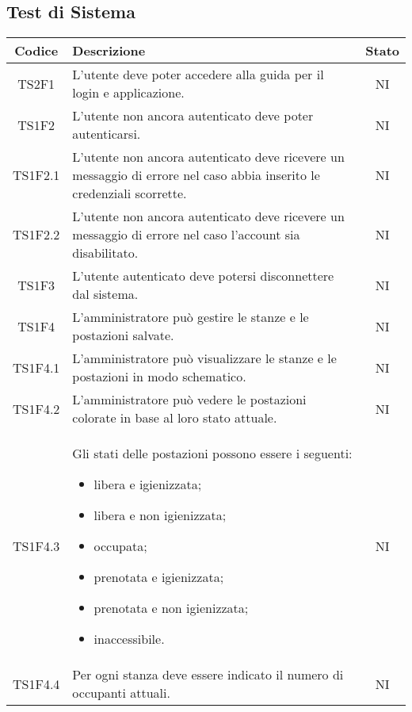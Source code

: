 	\subsection{Test di Sistema}
	\begin{center}
		\begin{longtable}{|c|p{10cm}|c|}
			\hline
			\rowcolor{lighter-grayer}
			\textbf{Codice} & \textbf{Descrizione} & \textbf{Stato}  \\ 
						
			\hline
			\endhead
			
			\hline
			TS2F1 & L'utente deve poter accedere alla guida per il login e applicazione. & NI \\
			\hline
			TS1F2 & L'utente non ancora autenticato deve poter autenticarsi. & NI \\			
			\hline
			TS1F2.1 & L'utente non ancora autenticato deve ricevere un messaggio di errore nel caso abbia inserito le credenziali scorrette. & NI \\			
			\hline
			TS1F2.2 & L'utente non ancora autenticato deve ricevere un messaggio di errore nel caso l'account sia disabilitato. & NI \\			
			\hline
			TS1F3 & L'utente autenticato deve potersi disconnettere dal sistema. & NI \\			
			\hline
			TS1F4 & L'amministratore può gestire le stanze e le postazioni salvate. & NI \\			
			\hline
			TS1F4.1 & L'amministratore può visualizzare le stanze e le postazioni in modo schematico. & NI \\			
			\hline
			TS1F4.2 & L'amministratore può vedere le postazioni colorate in base al loro stato attuale. & NI \\			
			\hline
			TS1F4.3 & Gli stati delle postazioni possono essere i seguenti:
			 \begin{itemize}
			 	\item libera e igienizzata;
			 	\item libera e non igienizzata;
			 	\item occupata;
			 	\item prenotata e igienizzata;
			 	\item prenotata e non igienizzata;
			 	\item inaccessibile.
			 \end{itemize}
			 & NI \\			
			\hline
			TS1F4.4 & Per ogni stanza deve essere indicato il numero di occupanti attuali. & NI \\			

\end{longtable}
\end{center}
